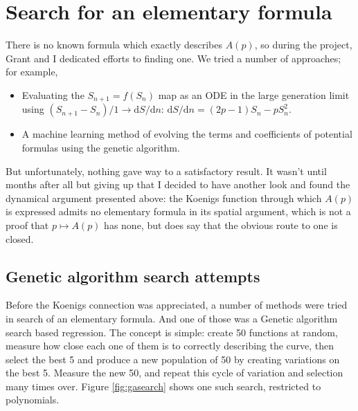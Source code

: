 \documentclass[11pt]{article}
\begin{document}
\section{Search for an elementary formula}
\label{sec:search}

There is no known formula which exactly describes $A(p)$, so during the project, Grant and I dedicated efforts
to finding one. We tried a number of approaches; for example, 

\begin{itemize}
    \item Evaluating the $S_{n+1} = f(S_n)$ map as an ODE in the large generation limit using $(S_{n+1} - S_n)/1 \to \mathrm{d}S / \mathrm{d} n$: $\mathrm{d}S / \mathrm{d} n = (2p-1)S_n - pS_{n}^2$.
    \item A machine learning method of evolving the terms and coefficients of potential formulas using the genetic algorithm.
\end{itemize}
But unfortunately, nothing gave way to a satisfactory result. It wasn't until months after all but giving up that I decided to have another look and found the dynamical argument presented above: the Koenigs function through which $A(p)$ is expressed admits no elementary formula in its spatial argument, which is not a proof that $p\mapsto A(p)$ has none, but does say that the obvious route to one is closed.

\subsection{Genetic algorithm search attempts}

Before the Koenigs connection was appreciated, a number of methods were tried in search of an elementary formula. 
And one of those was a Genetic algorithm search based regression. The concept is simple: create
50 functions at random, measure how close each one of them is to correctly describing the curve,
then select the best 5 and produce a new population of 50 by creating variations on the best 5. 
Measure the new 50, and repeat this cycle of variation and selection many times over.
Figure \ref{fig:gasearch} shows one such search, restricted to polynomials.
\end{document}
